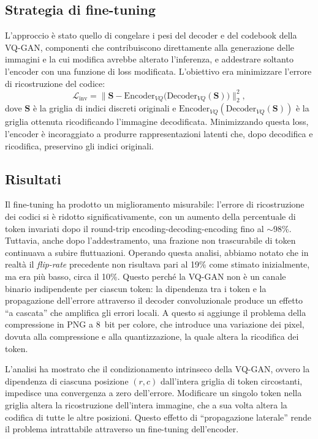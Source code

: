 \subsection{Strategia di fine-tuning}

L'approccio è stato quello di congelare i pesi del decoder e del codebook della VQ-GAN, componenti che contribuiscono direttamente alla generazione delle immagini e la cui modifica avrebbe alterato l'inferenza, e addestrare soltanto l'encoder con una funzione di loss modificata. L'obiettivo era minimizzare l'errore di ricostruzione del codice:
\[
	\mathcal{L}_{\mathrm{inv}} = \bigl\| \mathbf{S} - \mathrm{Encoder}_{VQ}\bigl(\mathrm{Decoder}_{VQ}(\mathbf{S})\bigr) \bigr\|_2^2,
\]
dove $\mathbf{S}$ è la griglia di indici discreti originali e $\mathrm{Encoder}_{VQ}(\mathrm{Decoder}_{VQ}(\mathbf{S}))$ è la griglia ottenuta ricodificando l'immagine decodificata. Minimizzando questa loss, l'encoder è incoraggiato a produrre rappresentazioni latenti che, dopo decodifica e ricodifica, preservino gli indici originali.

\subsection{Risultati}

Il fine-tuning ha prodotto un miglioramento misurabile: l'errore di ricostruzione dei codici si è ridotto significativamente, con un aumento della percentuale di token invariati dopo il round-trip encoding-decoding-encoding fino al $\sim$98\%. Tuttavia, anche dopo l'addestramento, una frazione non trascurabile di token continuava a subire fluttuazioni. Operando questa analisi, abbiamo notato che in realtà il \emph{flip-rate} precedente non risultava pari al 19\% come stimato inizialmente, ma era più basso, circa il 10\%. Questo perché la VQ-GAN non è un canale binario indipendente per ciascun token: la dipendenza tra i token e la propagazione dell'errore attraverso il decoder convoluzionale produce un effetto ``a cascata'' che amplifica gli errori locali. A questo si aggiunge il problema della compressione in PNG a 8~bit per colore, che introduce una variazione dei pixel, dovuta alla compressione e alla quantizzazione, la quale altera la ricodifica dei token.

L'analisi ha mostrato che il condizionamento intrinseco della VQ-GAN, ovvero la dipendenza di ciascuna posizione $(r, c)$ dall'intera griglia di token circostanti, impedisce una convergenza a zero dell'errore. Modificare un singolo token nella griglia altera la ricostruzione dell'intera immagine, che a sua volta altera la codifica di tutte le altre posizioni. Questo effetto di ``propagazione laterale'' rende il problema intrattabile attraverso un fine-tuning dell'encoder.

